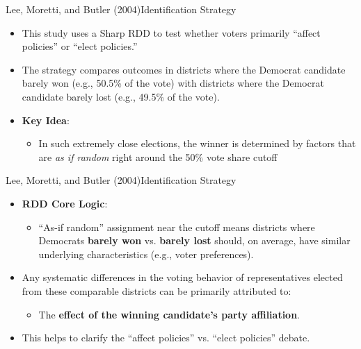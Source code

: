 \documentclass[hyperref={pdfpagelabels=false}]{beamer}
\begin{document}
\begin{frame}{Lee, Moretti, and Butler (2004)}{Identification Strategy}
	\begin{itemize}
		\item This study uses a Sharp RDD to test whether voters primarily ``affect policies'' or ``elect policies.''
		\vspace{0.2cm}
		\item The strategy compares outcomes in districts where the Democrat candidate barely won (e.g., 50.5\% of the vote) with districts where the Democrat candidate barely lost (e.g., 49.5\% of the vote).
		\vspace{0.2cm}
		\item \textbf{Key Idea}: 
			\begin{itemize}
		\item In such extremely close elections, the winner is determined by factors that are \textit{as if random} right around the 50\% vote share cutoff
			\end{itemize}
	\end{itemize}
\end{frame}




\begin{frame}{Lee, Moretti, and Butler (2004)}{Identification Strategy}
	\begin{itemize}
		\item \textbf{RDD Core Logic}: 
				\vspace{0.3cm} %
			\begin{itemize}
		\item ``As-if random'' assignment near the cutoff means districts where Democrats \textbf{barely won} vs. \textbf{barely lost} should, on average, have similar underlying characteristics (e.g., voter preferences).
			\end{itemize}
		\vspace{0.3cm} %
		\item Any systematic differences in the voting behavior of representatives elected from these comparable districts can be primarily attributed to: 
		\vspace{0.3cm} %
		\begin{itemize}
		\item The \textbf{effect of the winning candidate's party affiliation}.
		\vspace{0.3cm}
			\end{itemize}
		\item This helps to clarify the ``affect policies'' vs. ``elect policies'' debate.
	\end{itemize}
\end{frame}
\end{document}
